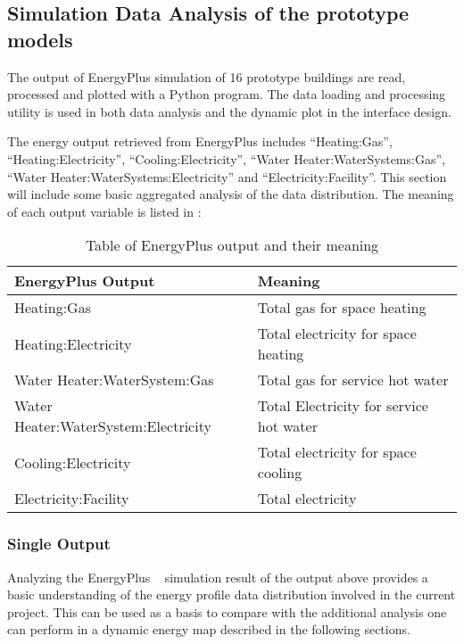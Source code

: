\subsection{Simulation Data Analysis of the prototype
  models}\label{boxPlot}
The output of EnergyPlus simulation of 16 prototype buildings are
read, processed and plotted with a Python program. The data loading
and processing utility is used in both data analysis and the dynamic
plot in the interface design.

The energy output retrieved from EnergyPlus includes ``Heating:Gas'',
``Heating:Electricity'', ``Cooling:Electricity'', ``Water
Heater:WaterSystems:Gas'', ``Water Heater:WaterSystems:Electricity''
and ``Electricity:Facility''. This section will include some basic
aggregated analysis of the data distribution.  The meaning of each
output variable is listed in :
\begin{table}[h!]
\centering
\caption{Table of EnergyPlus output and their meaning}
\label{tab:outputMeaning}
\begin{tabular}{l|l}
  \hline
  EnergyPlus Output            & Meaning\\
  \hline
  \hline
  Heating:Gas                  & Total gas for space heating         \\
  Heating:Electricity          & Total electricity for space heating \\
  Water Heater:WaterSystem:Gas & Total gas for service hot water     \\
  Water Heater:WaterSystem:Electricity & Total Electricity for service hot water     \\
  Cooling:Electricity          & Total electricity for space cooling \\
  Electricity:Facility         & Total electricity                  \\
  \hline
\end{tabular}
\end{table}

\subsubsection{Single Output}
Analyzing the EnergyPlus ~\cite{EnergyPlus2015} simulation result of
the output above provides a basic understanding of the energy profile
data distribution involved in the current project. This can be used as
a basis to compare with the additional analysis one can perform in a
dynamic energy map described in the following sections.

